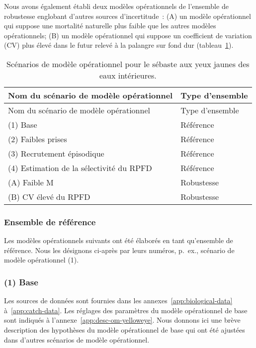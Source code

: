 \documentclass[french,11pt]{book}
\begin{document}
Nous avons également établi deux modèles opérationnels de l'ensemble de robustesse englobant d'autres sources d'incertitude~: (A) un modèle opérationnel qui suppose une mortalité naturelle plus faible que les autres modèles opérationnels; (B) un modèle opérationnel qui suppose un coefficient de variation (CV) plus élevé dans le futur relevé à la palangre sur fond dur (tableau~\ref{tab:ye-scen}).
\begin{longtable}[]{@{}ll@{}}
\caption{\label{tab:ye-scen}Scénarios de modèle opérationnel pour le sébaste aux yeux jaunes des eaux intérieures.}\tabularnewline
\toprule
Nom du scénario de modèle opérationnel & Type d'ensemble\tabularnewline
\midrule
\endfirsthead
\toprule
Nom du scénario de modèle opérationnel & Type d'ensemble\tabularnewline
\midrule
\endhead
(1) Base & Référence\tabularnewline
(2) Faibles prises & Référence\tabularnewline
(3) Recrutement épisodique & Référence\tabularnewline
(4) Estimation de la sélectivité du RPFD & Référence\tabularnewline
(A) Faible M & Robustesse\tabularnewline
(B) CV élevé du RPFD & Robustesse\tabularnewline
\bottomrule
\end{longtable}
\hypertarget{sec:approach3-reference}{%
\subsubsection{Ensemble de référence}\label{sec:approach3-reference}}

Les modèles opérationnels suivants ont été élaborés en tant qu'ensemble de référence. Nous les désignons ci-après par leurs numéros, p.~ex., scénario de modèle opérationnel (1).

\hypertarget{sec:approach3-reference1}{%
\subsubsection{(1) Base}\label{sec:approach3-reference1}}

Les sources de données sont fournies dans les annexes~\ref{app:biological-data} à~\ref{app:catch-data}. Les réglages des paramètres du modèle opérationnel de base sont indiqués à l'annexe~\ref{app:desc-om-yelloweye}. Nous donnons ici une brève description des hypothèses du modèle opérationnel de base qui ont été ajustées dans d'autres scénarios de modèle opérationnel.
\end{document}

